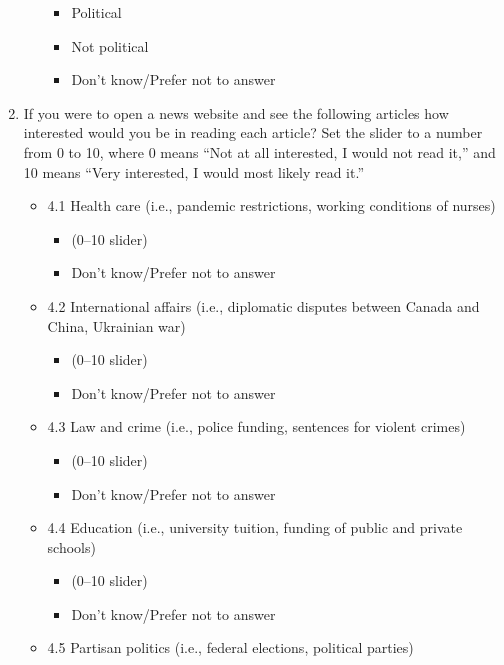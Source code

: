 \documentclass[
  letterpaper,
  DIV=11,
  numbers=noendperiod]{scrreprt}
\providecommand{\tightlist}{%
  \setlength{\itemsep}{0pt}\setlength{\parskip}{0pt}}\usepackage{longtable,booktabs,array}
\begin{document}
\begin{enumerate}
\begin{itemize}
    \begin{itemize}
    \tightlist
    \item
      Political
    \item
      Not political
    \item
      Don't know/Prefer not to answer
    \end{itemize}
  \end{itemize}
\item
  If you were to open a news website and see the following articles how
  interested would you be in reading each article? Set the slider to a
  number from 0 to 10, where 0 means ``Not at all interested, I would
  not read it,'' and 10 means ``Very interested, I would most likely
  read it.''

  \begin{itemize}
  \tightlist
  \item
    4.1 Health care (i.e., pandemic restrictions, working conditions of
    nurses)

    \begin{itemize}
    \tightlist
    \item
      (0--10 slider)
    \item
      Don't know/Prefer not to answer
    \end{itemize}
  \item
    4.2 International affairs (i.e., diplomatic disputes between Canada
    and China, Ukrainian war)

    \begin{itemize}
    \tightlist
    \item
      (0--10 slider)
    \item
      Don't know/Prefer not to answer
    \end{itemize}
  \item
    4.3 Law and crime (i.e., police funding, sentences for violent
    crimes)

    \begin{itemize}
    \tightlist
    \item
      (0--10 slider)
    \item
      Don't know/Prefer not to answer
    \end{itemize}
  \item
    4.4 Education (i.e., university tuition, funding of public and
    private schools)

    \begin{itemize}
    \tightlist
    \item
      (0--10 slider)
    \item
      Don't know/Prefer not to answer
    \end{itemize}
  \item
    4.5 Partisan politics (i.e., federal elections, political parties)


\end{itemize}
\end{enumerate}
\end{document}
